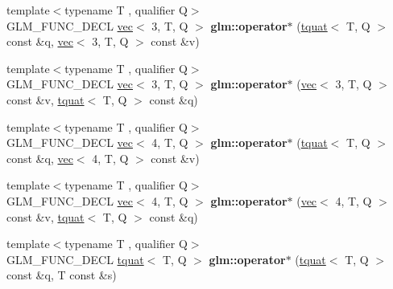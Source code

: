 \begin{DoxyCompactItemize}
\item 
\mbox{\label{group__gtc__quaternion_ga01cacfba4a28b21e7af7cdbb122c4ef9}} 
{\footnotesize template$<$typename T , qualifier Q$>$ }\\G\+L\+M\+\_\+\+F\+U\+N\+C\+\_\+\+D\+E\+CL \hyperlink{structglm_1_1vec}{vec}$<$ 3, T, Q $>$ {\bfseries glm\+::operator$\ast$} (\hyperlink{structglm_1_1tquat}{tquat}$<$ T, Q $>$ const \&q, \hyperlink{structglm_1_1vec}{vec}$<$ 3, T, Q $>$ const \&v)
\item 
\mbox{\label{group__gtc__quaternion_ga97f1c7e2d4ae80aad5d8813aed7d860e}} 
{\footnotesize template$<$typename T , qualifier Q$>$ }\\G\+L\+M\+\_\+\+F\+U\+N\+C\+\_\+\+D\+E\+CL \hyperlink{structglm_1_1vec}{vec}$<$ 3, T, Q $>$ {\bfseries glm\+::operator$\ast$} (\hyperlink{structglm_1_1vec}{vec}$<$ 3, T, Q $>$ const \&v, \hyperlink{structglm_1_1tquat}{tquat}$<$ T, Q $>$ const \&q)
\item 
\mbox{\label{group__gtc__quaternion_ga69d38a6ce6b49b97147c26274ada8911}} 
{\footnotesize template$<$typename T , qualifier Q$>$ }\\G\+L\+M\+\_\+\+F\+U\+N\+C\+\_\+\+D\+E\+CL \hyperlink{structglm_1_1vec}{vec}$<$ 4, T, Q $>$ {\bfseries glm\+::operator$\ast$} (\hyperlink{structglm_1_1tquat}{tquat}$<$ T, Q $>$ const \&q, \hyperlink{structglm_1_1vec}{vec}$<$ 4, T, Q $>$ const \&v)
\item 
\mbox{\label{group__gtc__quaternion_ga16c91c9dc2f0346faa3742888339b11d}} 
{\footnotesize template$<$typename T , qualifier Q$>$ }\\G\+L\+M\+\_\+\+F\+U\+N\+C\+\_\+\+D\+E\+CL \hyperlink{structglm_1_1vec}{vec}$<$ 4, T, Q $>$ {\bfseries glm\+::operator$\ast$} (\hyperlink{structglm_1_1vec}{vec}$<$ 4, T, Q $>$ const \&v, \hyperlink{structglm_1_1tquat}{tquat}$<$ T, Q $>$ const \&q)
\item 
\mbox{\label{group__gtc__quaternion_ga603ee29c61884b9438d5eae0c548b891}} 
{\footnotesize template$<$typename T , qualifier Q$>$ }\\G\+L\+M\+\_\+\+F\+U\+N\+C\+\_\+\+D\+E\+CL \hyperlink{structglm_1_1tquat}{tquat}$<$ T, Q $>$ {\bfseries glm\+::operator$\ast$} (\hyperlink{structglm_1_1tquat}{tquat}$<$ T, Q $>$ const \&q, T const \&s)

\end{DoxyCompactItemize}
